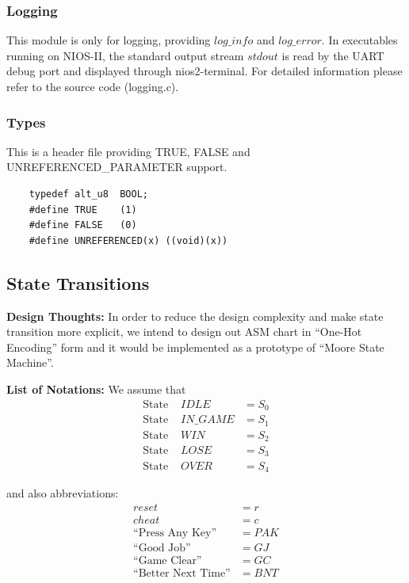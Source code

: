 \documentclass[conference]{IEEEtran}
\begin{document}
\subsubsection{Logging}
This module is only for logging, providing $log\_info$ and $log\_error$. In executables running on NIOS-II, the standard output stream $stdout$ is read by the UART debug port and displayed through nios2-terminal. For detailed information please refer to the source code (logging.c).

\subsubsection{Types}
This is a header file providing TRUE, FALSE and UNREFERENCED\_PARAMETER support.
\begin{lstlisting}
    typedef alt_u8  BOOL;
    #define TRUE    (1)
    #define FALSE   (0)
    #define UNREFERENCED(x) ((void)(x))
\end{lstlisting}


\subsection{State Transitions}

\textbf{Design Thoughts:} In order to reduce the design complexity and make state transition more explicit, we intend to design out ASM chart in ``One-Hot Encoding'' form and it would be implemented as a prototype of ``Moore State Machine''.

\textbf{List of Notations:} We assume that 
\begin{align*}
    \text{State } &IDLE &= S_0 \\ 
    \text{State } &IN\_GAME &= S_1 \\
    \text{State } &WIN &= S_2 \\
    \text{State } &LOSE &= S_3 \\
    \text{State } &OVER &= S_4
\end{align*}

and also abbreviations:
\begin{align*}
    reset &= r \\ 
    cheat &= c \\
    \text{``Press Any Key''} &= PAK \\ 
    \text{``Good Job''} &= GJ \\
    \text{``Game Clear''} &= GC \\
    \text{``Better Next Time''} &= BNT
\end{align*}
\end{document}
